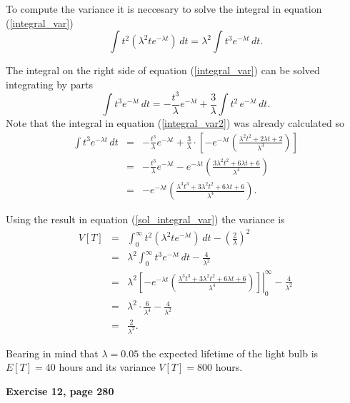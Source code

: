 \documentclass[12pt]{article}
\begin{document}
	To compute the variance it is neccesary to solve the integral in equation (\ref{integral_var})
	\begin{equation}
	\int t^2 \left( \lambda^2 t e^{-\lambda t} \right) \, dt = \lambda^2 \int t^3e^{-\lambda t} \, dt.
	\label{integral_var}
	\end{equation}
	
	The integral on the right side of equation (\ref{integral_var}) can be solved integrating by parts
	\begin{equation}
	\int t^3e^{-\lambda t} \, dt = -\frac{t^3}{\lambda}e^{-\lambda t} + \frac{3}{\lambda} \int t^2 \, e^{-\lambda t}\, dt.
	\label{integral_var2}
	\end{equation}
	Note that the integral in equation (\ref{integral_var2}) was already calculated so
	\begin{eqnarray}
	\int t^3e^{-\lambda t} \, dt &=& -\frac{t^3}{\lambda}e^{-\lambda t} + \frac{3}{\lambda} \cdot \left[- e^{-\lambda t} \left( \frac{\lambda^2 t^2 + 2\lambda t + 2}{\lambda^3} \right) \right] \nonumber \\
	&=& -\frac{t^3}{\lambda}e^{-\lambda t} - e^{-\lambda t} \left( \frac{3\lambda^2 t^2 + 6\lambda t + 6}{\lambda^4} \right) \nonumber \\
	&=& - e^{-\lambda t} \left( \frac{\lambda^3t^3 + 3\lambda^2 t^2 + 6\lambda t + 6}{\lambda^4} \right).
	\label{sol_integral_var}
	\end{eqnarray}
	
	Using the result in equation (\ref{sol_integral_var}) the variance is
	\begin{eqnarray*}
	V[T] &=& \int_{0}^{\infty} t^2 \left( \lambda^2 t e^{-\lambda t} \right) \, dt - \left(\frac{2}{\lambda}\right)^2 \\
	&=& \lambda^2 \int_{0}^{\infty} t^3e^{-\lambda t} \, dt - \frac{4}{\lambda^2} \\
	&=& \lambda^2 \left. \left[- e^{-\lambda t} \left( \frac{\lambda^3t^3 + 3\lambda^2 t^2 + 6\lambda t + 6}{\lambda^4} \right)\right] \right|_{0}^{\infty} - \frac{4}{\lambda^2} \\
	&=& \lambda^2 \cdot \frac{6}{\lambda^4} - \frac{4}{\lambda^2}\\ 
	&=& \frac{2}{\lambda^2}.
	\end{eqnarray*}

	Bearing in mind that $\lambda=0.05$ the expected lifetime of the light bulb is $E[T] = 40$ hours and its variance $V[T] = 800$ hours.
	
	{\bf Exercise 12, page 280}
	
\end{document}
